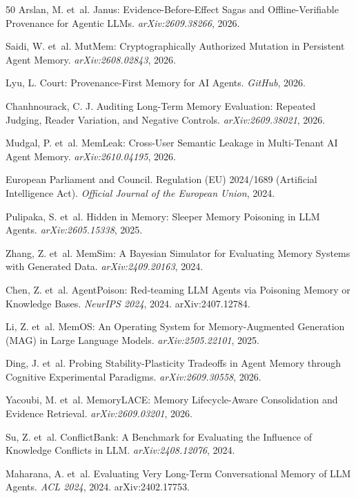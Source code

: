 \documentclass[11pt]{article}
\begin{document}
\begin{thebibliography}{50}
Arslan, M. et~al.
\newblock Janus: Evidence-Before-Effect Sagas and Offline-Verifiable Provenance for Agentic LLMs.
\newblock \emph{arXiv:2609.38266}, 2026.

Saidi, W. et~al.
\newblock MutMem: Cryptographically Authorized Mutation in Persistent Agent Memory.
\newblock \emph{arXiv:2608.02843}, 2026.

Lyu, L.
\newblock Court: Provenance-First Memory for AI Agents.
\newblock \emph{GitHub}, 2026.


Chanhnourack, C. J.
\newblock Auditing Long-Term Memory Evaluation: Repeated Judging, Reader Variation, and Negative Controls.
\newblock \emph{arXiv:2609.38021}, 2026.

Mudgal, P. et~al.
\newblock MemLeak: Cross-User Semantic Leakage in Multi-Tenant AI Agent Memory.
\newblock \emph{arXiv:2610.04195}, 2026.

European Parliament and Council.
\newblock Regulation (EU) 2024/1689 (Artificial Intelligence Act).
\newblock \emph{Official Journal of the European Union}, 2024.



Pulipaka, S. et~al.
\newblock Hidden in Memory: Sleeper Memory Poisoning in LLM Agents. \newblock \emph{arXiv:2605.15338}, 2025.

Zhang, Z. et~al.
\newblock MemSim: A Bayesian Simulator for Evaluating Memory Systems with Generated Data.
\newblock \emph{arXiv:2409.20163}, 2024.

Chen, Z. et~al.
\newblock AgentPoison: Red-teaming LLM Agents via Poisoning Memory or Knowledge Bases.
\newblock \emph{NeurIPS 2024}, 2024. arXiv:2407.12784.

Li, Z. et~al.
\newblock MemOS: An Operating System for Memory-Augmented Generation (MAG) in Large Language Models.
\newblock \emph{arXiv:2505.22101}, 2025.

Ding, J. et~al.
\newblock Probing Stability-Plasticity Tradeoffs in Agent Memory through Cognitive Experimental Paradigms.
\newblock \emph{arXiv:2609.30558}, 2026.

Yacoubi, M. et~al.
\newblock MemoryLACE: Memory Lifecycle-Aware Consolidation and Evidence Retrieval.
\newblock \emph{arXiv:2609.03201}, 2026.

Su, Z. et~al.
\newblock ConflictBank: A Benchmark for Evaluating the Influence of Knowledge Conflicts in LLM.
\newblock \emph{arXiv:2408.12076}, 2024.

Maharana, A. et~al.
\newblock Evaluating Very Long-Term Conversational Memory of LLM Agents.
\newblock \emph{ACL 2024}, 2024. arXiv:2402.17753.

\end{thebibliography}
\end{document}
